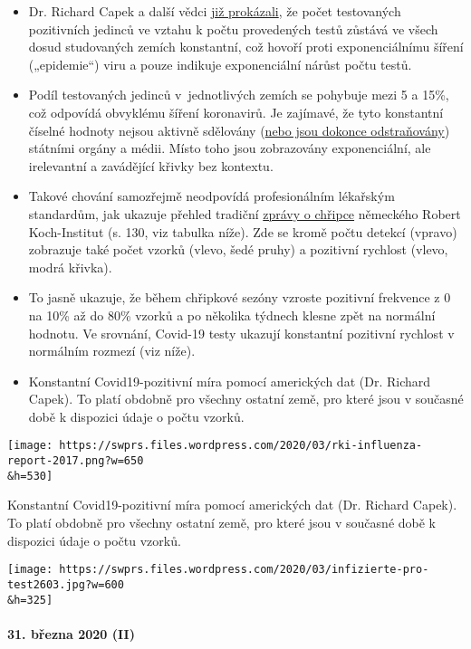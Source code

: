 \begin{itemize}
\tightlist
\item
  Dr. Richard Capek a další vědci
  \href{https://coronadaten.wordpress.com/}{již prokázali}, že počet
  testovaných pozitivních jedinců ve vztahu k počtu provedených testů
  zůstává ve všech dosud studovaných zemích konstantní, což hovoří proti
  exponenciálnímu šíření („epidemie``) viru a pouze indikuje
  exponenciální nárůst počtu testů.
\item
  Podíl testovaných jedinců v~jednotlivých zemích se pohybuje mezi 5 a
  15\%, což odpovídá obvyklému šíření koronavirů. Je zajímavé, že tyto
  konstantní číselné hodnoty nejsou aktivně sdělovány
  (\href{https://multipolar-magazin.de/artikel/coronavirus-irrefuhrung-fallzahlen}{nebo
  jsou dokonce odstraňovány}) státními orgány a médii. Místo toho jsou
  zobrazovány exponenciální, ale irelevantní a zavádějící křivky bez
  kontextu.
\item
  Takové chování samozřejmě neodpovídá profesionálním lékařským
  standardům, jak ukazuje přehled tradiční
  \href{https://influenza.rki.de/Saisonberichte/2017.pdf}{zprávy o
  chřipce} německého Robert Koch-Institut (s. 130, viz tabulka níže).
  Zde se kromě počtu detekcí (vpravo) zobrazuje také počet vzorků
  (vlevo, šedé pruhy) a pozitivní rychlost (vlevo, modrá křivka).
\item
  To jasně ukazuje, že během chřipkové sezóny vzroste pozitivní
  frekvence z 0 na 10\% až do 80\% vzorků a po několika týdnech klesne
  zpět na normální hodnotu. Ve srovnání, Covid-19 testy ukazují
  konstantní pozitivní rychlost v normálním rozmezí (viz níže).
\item
  Konstantní Covid19-pozitivní míra pomocí amerických dat (Dr. Richard
  Capek). To platí obdobně pro všechny ostatní země, pro které jsou v
  současné době k dispozici údaje o počtu vzorků.
\end{itemize}

\texttt{[image: https://swprs.files.wordpress.com/2020/03/rki-influenza-report-2017.png?w=650\\\&h=530]}

Konstantní Covid19-pozitivní míra pomocí amerických dat (Dr. Richard
Capek). To platí obdobně pro všechny ostatní země, pro které jsou v
současné době k dispozici údaje o počtu vzorků.

\texttt{[image: https://swprs.files.wordpress.com/2020/03/infizierte-pro-test2603.jpg?w=600\\\&h=325]}

\hypertarget{31-bux159ezna-2020-ii}{%
\paragraph{31. března 2020 (II)}\label{31-bux159ezna-2020-ii}}


